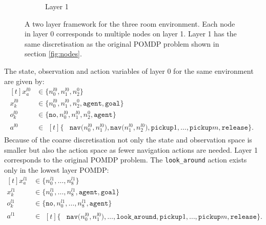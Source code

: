 \begin{figure}
\begin{subfigure}[b]{0.48\textwidth}
        \caption{Layer 1}
        \label{subfig:l1}
    \end{subfigure}
    \caption{A two layer framework for the three room environment. Each node in layer 0 corresponds to multiple nodes on layer 1. Layer 1 has the same discretisation as the original POMDP problem shown in section \ref{fig:nodes}.}
    \label{fig:two_layers}
\end{figure}
The state, observation and action variables of layer 0 for the same environment are given by:
%
\begin{equation}\label{eq:l0}
    \begin{aligned}[t] 
        x_a^{l0} &\in \big\{n_0^{l0}, n_1^{l0}, n_2^{0}  \big\} \\
        x_k^{l0} &\in  \big\{n_0^{l0}, n_1^{l0}, n_2^{0}, \texttt{agent},\texttt{goal}  \big\}\\
        o_k^{l0} &\in \big\{\texttt{no}, n_0^{l0}, n_1^{l0}, n_2^{0}, \texttt{agent} \big\}\\
        a^{l0} &\in \begin{aligned}[t]\big\{&\texttt{nav($n_0^{l0}, n_1^{l0}$)}, \texttt{nav($n_1^{l0}, n_2^{l0}$)},\texttt{pickup}1, \ldots, \texttt{pickup}m, \texttt{release}\big\}.
        \end{aligned}
    \end{aligned}
\end{equation}
%
Because of the coarse discretisation not only the state and observation space is smaller but also the action space as fewer navigation actions are needed. Layer 1 corresponds to the original POMDP problem. The \texttt{look\_around} action exists only in the lowest layer POMDP:
%
\begin{equation}\label{eq:l1}
    \begin{aligned}[t] 
        x_a^{l1} &\in \big\{n_0^{l1}, \ldots, n_8^{l1} \big\} \\
        x_k^{l1} &\in  \big\{n_0^{l1},\ldots, n_8^{l1}, \texttt{agent},\texttt{goal}  \big\}\\
        o_k^{l1} &\in \big\{\texttt{no}, n_0^{l1},\ldots, n_8^{l1}, \texttt{agent} \big\}\\
        a^{l1} &\in \begin{aligned}[t]\big\{&\texttt{nav($n_0^{l0}, n_1^{l0}$)}, \ldots,\texttt{look\_around}, \texttt{pickup}1, \ldots, \texttt{pickup}m, \texttt{release}\big\}.
        \end{aligned}
    \end{aligned}
\end{equation}
